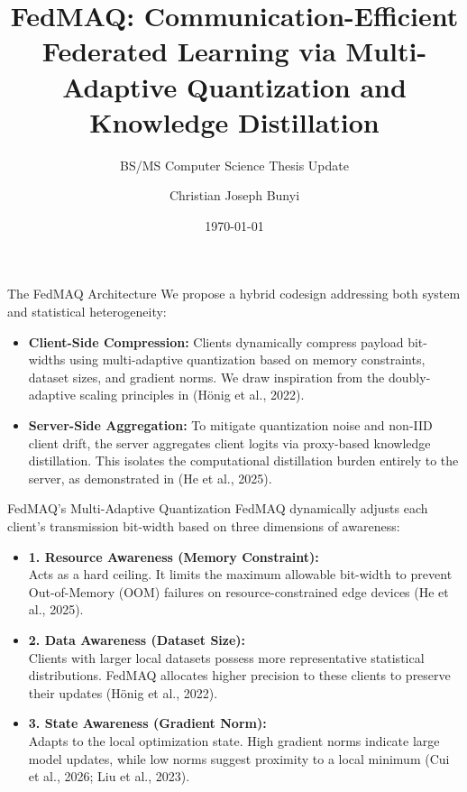 \documentclass[11pt, aspectratio=169]{beamer}
\title{FedMAQ: Communication-Efficient Federated Learning via Multi-Adaptive Quantization and Knowledge Distillation}
\subtitle{BS/MS Computer Science Thesis Update}
\author{Christian Joseph Bunyi}
\institute{Dr. Andrew L. Tan Data Science Institute \\ De La Salle University}
\date{\today}
\begin{document}
\begin{frame}[plain]
    \titlepage
\end{frame}

\begin{frame}{The FedMAQ Architecture}
    We propose a hybrid codesign addressing both system and statistical heterogeneity:
    \vspace{0.3cm}
    \begin{itemize}
        \item \textbf{Client-Side Compression:} Clients dynamically compress payload bit-widths using multi-adaptive quantization based on memory constraints, dataset sizes, and gradient norms. We draw inspiration from the doubly-adaptive scaling principles in (Hönig et al., 2022).
              \vspace{0.2cm}
        \item \textbf{Server-Side Aggregation:} To mitigate quantization noise and non-IID client drift, the server aggregates client logits via proxy-based knowledge distillation. This isolates the computational distillation burden entirely to the server, as demonstrated in (He et al., 2025).
    \end{itemize}
\end{frame}

\begin{frame}{FedMAQ's Multi-Adaptive Quantization}
    \small
    FedMAQ dynamically adjusts each client's transmission bit-width based on three dimensions of awareness:
    \vspace{0.2cm}
    \begin{itemize}
        \item[] \textbf{1. Resource Awareness (Memory Constraint):} \\
              Acts as a hard ceiling. It limits the maximum allowable bit-width to prevent Out-of-Memory (OOM) failures on resource-constrained edge devices (He et al., 2025).
        \item[] \textbf{2. Data Awareness (Dataset Size):} \\
              Clients with larger local datasets possess more representative statistical distributions. FedMAQ allocates higher precision to these clients to preserve their updates (Hönig et al., 2022).
        \item[] \textbf{3. State Awareness (Gradient Norm):} \\
              Adapts to the local optimization state. High gradient norms indicate large model updates, while low norms suggest proximity to a local minimum (Cui et al., 2026; Liu et al., 2023).
    \end{itemize}
\end{frame}
\end{document}
